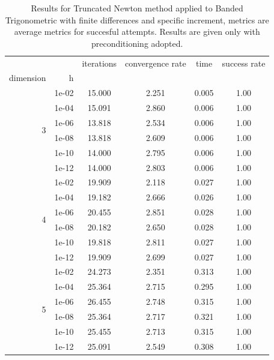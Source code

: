 \begin{table}
\centering
\caption{Results for Truncated Newton method applied to Banded Trigonometric with finite differences and specific increment, metrics are average metrics for succesful attempts. Results are given only with preconditioning adopted.}
\label{tab:Truncated_Newton_Banded_Trigonometric_fd_rel}
\begin{tabular}{rr|cccc}
\toprule
    &  & iterations & convergence rate & time & success rate \\
dimension & h &  &  &  &  \\
\midrule
\multirow[t]{6}{*}{3} & 1e-02 & 15.000 & 2.251 & 0.005 & 1.00 \\
    & 1e-04 & 15.091 & 2.860 & 0.006 & 1.00 \\
    & 1e-06 & 13.818 & 2.534 & 0.006 & 1.00 \\
    & 1e-08 & 13.818 & 2.609 & 0.006 & 1.00 \\
    & 1e-10 & 14.000 & 2.795 & 0.006 & 1.00 \\
    & 1e-12 & 14.000 & 2.803 & 0.006 & 1.00 \\
\cline{1-6}
\multirow[t]{6}{*}{4} & 1e-02 & 19.909 & 2.118 & 0.027 & 1.00 \\
    & 1e-04 & 19.182 & 2.666 & 0.026 & 1.00 \\
    & 1e-06 & 20.455 & 2.851 & 0.028 & 1.00 \\
    & 1e-08 & 20.182 & 2.650 & 0.028 & 1.00 \\
    & 1e-10 & 19.818 & 2.811 & 0.027 & 1.00 \\
    & 1e-12 & 19.909 & 2.699 & 0.027 & 1.00 \\
\cline{1-6}
\multirow[t]{6}{*}{5} & 1e-02 & 24.273 & 2.351 & 0.313 & 1.00 \\
    & 1e-04 & 25.364 & 2.715 & 0.295 & 1.00 \\
    & 1e-06 & 26.455 & 2.748 & 0.315 & 1.00 \\
    & 1e-08 & 25.364 & 2.717 & 0.321 & 1.00 \\
    & 1e-10 & 25.455 & 2.713 & 0.315 & 1.00 \\
    & 1e-12 & 25.091 & 2.549 & 0.308 & 1.00 \\
\cline{1-6}
\bottomrule
\end{tabular}
\end{table}